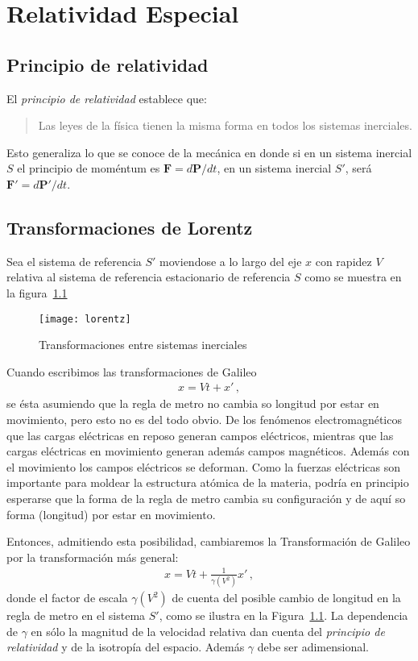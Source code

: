 
\chapter{Relatividad Especial}

\section{Principio de relatividad}
El \emph{principio de relatividad} establece que:
\begin{quote}
  Las leyes de la física tienen la misma forma en todos los sistemas inerciales. 
\end{quote}
Esto generaliza lo que se conoce de la mecánica en donde si en un sistema inercial $S$ el principio de moméntum  es $\mathbf{F}=d\mathbf{P}/dt$, en un sistema inercial $S'$, será $\mathbf{F}'=d\mathbf{P}'/dt$.
\section{Transformaciones de Lorentz}
Sea el sistema de referencia $S'$ moviendose a lo largo del eje $x$ con rapidez $V$ relativa al sistema de referencia estacionario de referencia $S$ como se muestra en la figura~\ref{fig:lorentz}
\begin{figure}
  \centering
  \texttt{[image: lorentz]}
  \caption{Transformaciones entre sistemas inerciales}
  \label{fig:lorentz}
\end{figure}

Cuando escribimos las transformaciones de Galileo
\begin{align*}
  x=Vt+x'\,,
\end{align*}
se ésta asumiendo que la regla de metro no cambia so longitud por estar en movimiento, pero esto no es del todo obvio. De los fenómenos electromagnéticos que las cargas eléctricas en reposo generan campos eléctricos, mientras que las cargas eléctricas en movimiento generan además campos magnéticos. Además con el movimiento los campos eléctricos se deforman. Como la fuerzas eléctricas son importante para moldear la estructura atómica de la materia, podría en principio esperarse que la forma de la regla de metro cambia su configuración y de aquí so forma (longitud) por estar en movimiento. 


Entonces, admitiendo esta posibilidad, cambiaremos la Transformación de Galileo por la transformación más general:
\begin{align}
  \label{eq:gammafactor}
  x=Vt+\frac{1}{\gamma(V^2)} x'\,,
\end{align}
donde el factor de escala $\gamma(V^2)$ de cuenta del posible cambio de longitud en la regla de metro en el sistema $S'$, como se ilustra en la Figura~\ref{fig:lorentz}. La dependencia de $\gamma$ en sólo la magnitud de la velocidad relativa dan cuenta del \emph{principio de relatividad} y de la isotropía del espacio. Además $\gamma$ debe ser adimensional.

